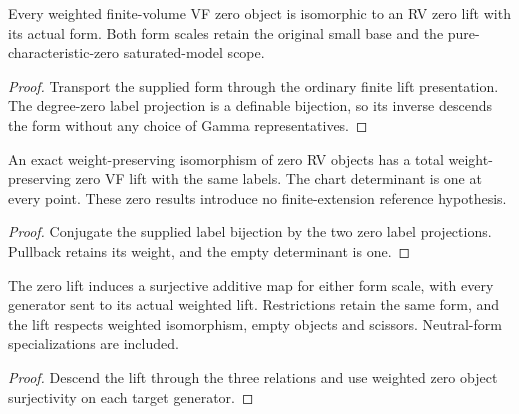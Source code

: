 \begin{theorem}
\label{thm:measured-zero-objects}
\leanok
Every weighted finite-volume VF zero object is isomorphic to an RV
zero lift with its actual form. Both form scales retain the original
small base and the pure-characteristic-zero saturated-model scope.
\end{theorem}
\begin{proof}
\leanok
{}
Transport the supplied form through the ordinary finite lift
presentation. The degree-zero label projection is a definable
bijection, so its inverse descends the form without any choice of
Gamma representatives.
\end{proof}

\begin{theorem}
\label{thm:measured-zero-isomorphisms}
\leanok
An exact weight-preserving isomorphism of zero RV objects has a total
weight-preserving zero VF lift with the same labels. The chart
determinant is one at every point. These zero results introduce no
finite-extension reference hypothesis.
\end{theorem}
\begin{proof}
\leanok
Conjugate the supplied label bijection by the two zero label
projections. Pullback retains its weight, and the empty determinant
is one.
\end{proof}

\begin{corollary}
\label{cor:measured-zero-scissors}
\leanok
The zero lift induces a surjective additive map for either form scale,
with every generator sent to its actual weighted lift. Restrictions
retain the same form, and the lift respects weighted isomorphism,
empty objects and scissors. Neutral-form specializations are included.
\end{corollary}
\begin{proof}
\leanok
{}
Descend the lift through the three relations and use weighted zero
object surjectivity on each target generator.
\end{proof}

